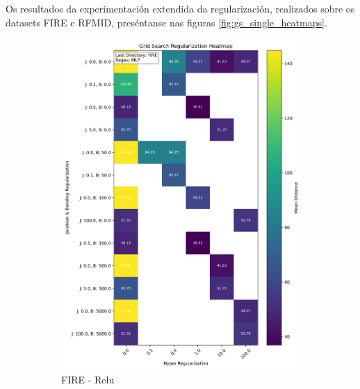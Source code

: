 Os resultados da experimentación extendida da regularización, realizados sobre os datasets FIRE e RFMID, preséntanse nas figuras \ref{fig:gs_single_heatmaps}.

\begin{figure}[tbp]
    \centering
    \begin{subfigure}[b]{0.4\textwidth}
        \centering
        \includegraphics[width=\textwidth]{imaxes/grid_search_single_heatmap_FIRE_MLP.png}
        \caption{FIRE - Relu}
        \label{fig:gs_single_FIRE_MLP}
    \end{subfigure}\hfill
    \begin{subfigure}[b]{0.4\textwidth}
        \centering

\end{subfigure}
\end{figure}
